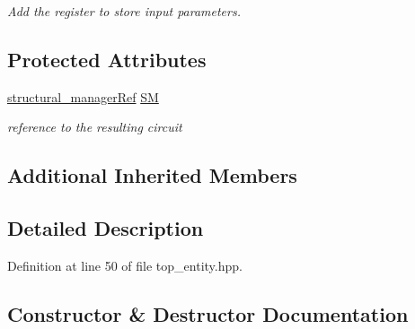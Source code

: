 \begin{DoxyCompactItemize}
\begin{DoxyCompactList}\small\item\em Add the register to store input parameters. \end{DoxyCompactList}\end{DoxyCompactItemize}
\subsection*{Protected Attributes}
\begin{DoxyCompactItemize}
\item 
\hyperlink{structural__manager_8hpp_ab3136f0e785d8535f8d252a7b53db5b5}{structural\+\_\+manager\+Ref} \hyperlink{classtop__entity_acc7310a6d8736a54e75462e211d2fc32}{SM}
\begin{DoxyCompactList}\small\item\em reference to the resulting circuit \end{DoxyCompactList}\end{DoxyCompactItemize}
\subsection*{Additional Inherited Members}


\subsection{Detailed Description}


Definition at line 50 of file top\+\_\+entity.\+hpp.



\subsection{Constructor \& Destructor Documentation}
\mbox{\label{classtop__entity_adc1d91ea0660baba3b103fbe053b0d30}} 
